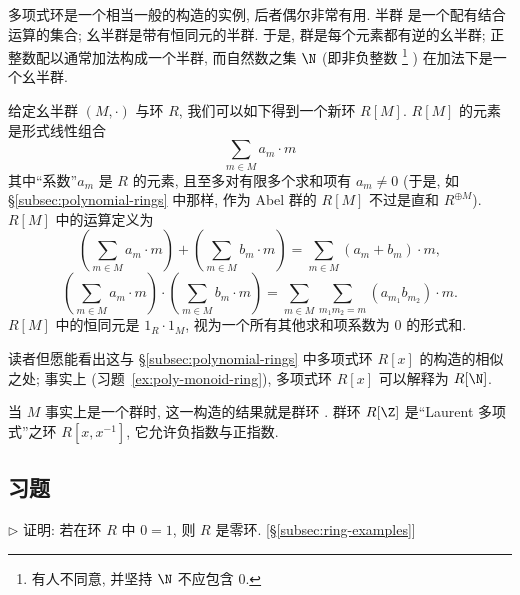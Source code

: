多项式环是一个相当一般的构造的实例, 后者偶尔非常有用. 半群%
是一个配有结合运算的集合; 幺半群是带有恒同元的半群. 于是, 群是每个元素都有逆的幺半群; 正整数配以通常加法构成一个半群, 而自然数之集 $\N$ (即非负整数%
\footnote{有人不同意, 并坚持 $\N$ 不应包含 $0$.}%
) 在加法下是一个幺半群.

给定幺半群 $(M, \cdot)$ 与环 $R$, 我们可以如下得到一个新环 $R[M]$. $R[M]$ 的元素是形式线性组合
\[
\sum_{m \in M} a_m \cdot m
\]
其中``系数''$a_m$ 是 $R$ 的元素, 且至多对有限多个求和项有 $a_m \neq 0$ (于是, 如 \S\ref{subsec:polynomial-rings} 中那样, 作为 Abel 群的 $R[M]$ 不过是直和 $R^{\oplus M}$). $R[M]$ 中的运算定义为
\[
\left(\sum_{m \in M} a_m \cdot m\right) + \left(\sum_{m \in M} b_m \cdot m\right) = \sum_{m \in M} (a_m + b_m) \cdot m,
\]
\[
\left(\sum_{m \in M} a_m \cdot m\right) \cdot \left(\sum_{m \in M} b_m \cdot m\right) = \sum_{m \in M} \sum_{m_1 m_2 = m} (a_{m_1} b_{m_2}) \cdot m.
\]
$R[M]$ 中的恒同元是 $1_R \cdot 1_M$, 视为一个所有其他求和项系数为 $0$ 的形式和.

读者但愿能看出这与 \S\ref{subsec:polynomial-rings} 中多项式环 $R[x]$ 的构造的相似之处; 事实上 (习题~\ref{ex:poly-monoid-ring}), 多项式环 $R[x]$ 可以解释为 $R[\N]$.

当 $M$ 事实上是一个群时, 这一构造的结果就是群环%
. 群环 $R[\Z]$ 是``Laurent 多项式''之环 $R[x, x^{-1}]$, 它允许负指数与正指数.

\subsection*{习题}
{}

\begin{prob}
\label{ex:zero-one}
$\triangleright$ 证明: 若在环 $R$ 中 $0 = 1$, 则 $R$ 是零环. [\S\ref{subsec:ring-examples}]
\end{prob}

